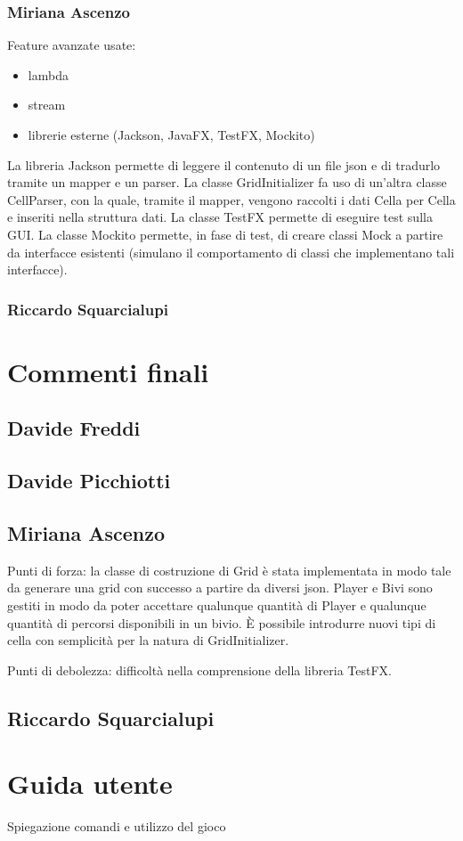 \documentclass[a4paper,12pt]{report}
\begin{document}
\subsection{Miriana Ascenzo}

Feature avanzate usate:
\begin{itemize}
    \item lambda
    \item stream
    \item librerie esterne (Jackson, JavaFX, TestFX, Mockito)
\end {itemize}
La libreria Jackson permette di leggere il contenuto di un file json e di tradurlo tramite un mapper e un parser.
%
La classe GridInitializer fa uso di un’altra classe CellParser, con la quale, tramite il mapper, vengono raccolti i dati Cella per Cella e inseriti nella struttura dati.
%
La classe TestFX permette di eseguire test sulla GUI.
%
La classe Mockito permette, in fase di test, di creare classi Mock a partire da interfacce esistenti (simulano il comportamento di classi che implementano tali interfacce).

\subsection{Riccardo Squarcialupi}

\chapter{Commenti finali}

\section{Davide Freddi}
\section{Davide Picchiotti}
\section{Miriana Ascenzo}

Punti di forza: la classe di costruzione di Grid è stata implementata in modo tale da generare una grid con successo a partire da diversi json.
%
Player e Bivi sono gestiti in modo da poter accettare qualunque quantità di Player e qualunque quantità di percorsi disponibili in un bivio.
%
È possibile introdurre nuovi tipi di cella con semplicità per la natura di GridInitializer.

Punti di debolezza: difficoltà nella comprensione della libreria TestFX.


\section{Riccardo Squarcialupi}

\appendix
\chapter{Guida utente}

Spiegazione comandi e utilizzo del gioco



\end{document}
